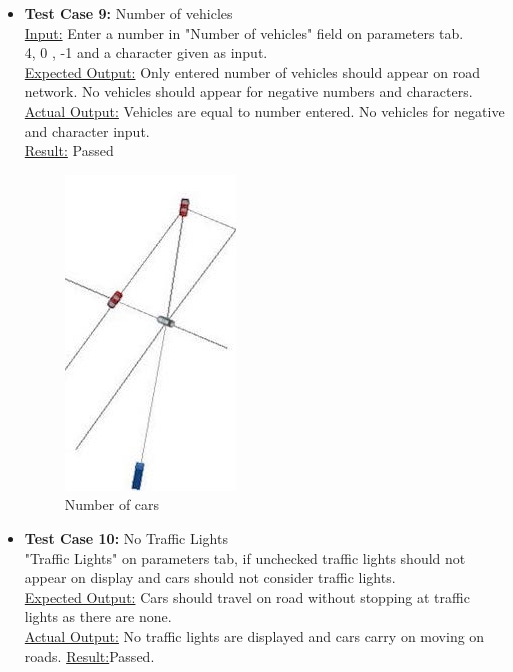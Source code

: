 \documentclass[11pt]{article}
\begin{document}
\begin{itemize}
\begin{itemize}
		
		\item\textbf{Test Case 9:} Number of vehicles\hfill \\
		\underline{Input:} Enter a number in "Number of vehicles" field on parameters tab.\hfill \\
		4, 0 , -1 and a character given as input.\hfill \\
		\underline{Expected Output:} Only entered number of vehicles should appear on road network. No vehicles should appear for negative numbers and characters. \hfill \\
		\underline{Actual Output:}  Vehicles are equal to number entered. No vehicles for negative and character input.\hfil \\
		\underline{Result:} Passed\hfil \\
		\begin{figure}[h]
		\begin{center}
		\includegraphics[scale=0.8]{4cars}
		\caption{Number of cars}
		\end{center}
		\end{figure}
		
		\item \textbf{Test Case 10:} No Traffic Lights\hfill \\
		"Traffic Lights" on parameters tab, if unchecked traffic lights should not appear on display and cars should not consider traffic lights.\hfill \\
		\underline{Expected Output:} Cars should travel on road without stopping at traffic lights as there are none.\hfill \\
		\underline{Actual Output:} No traffic lights are displayed and cars carry on moving on roads.
		\underline{Result:}Passed.
		

\end{itemize}
\end{itemize}
\end{document}
